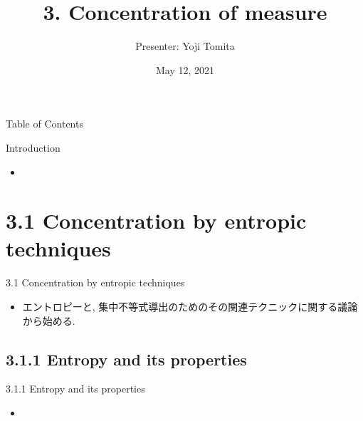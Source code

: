\documentclass[aspectratio=169, dvipdfmx]{beamer}
\title{3. Concentration of measure}
\author{Presenter: Yoji Tomita}
\date{May 12, 2021}
\begin{document}
\maketitle

\begin{frame}{Table of Contents}
    \tableofcontents
\end{frame}

\begin{frame}{Introduction}
\begin{itemize}
    \item 
\end{itemize}
\end{frame}

\section{3.1 Concentration by entropic techniques}

\begin{frame}{3.1 Concentration by entropic techniques}
\begin{itemize}
    \item エントロピーと, 集中不等式導出のためのその関連テクニックに関する議論から始める.
\end{itemize}
\end{frame}

\subsection{3.1.1 Entropy and its properties}
\begin{frame}{3.1.1 Entropy and its properties}
\begin{itemize}
    \item 
\end{itemize}
\end{frame}
\end{document}
